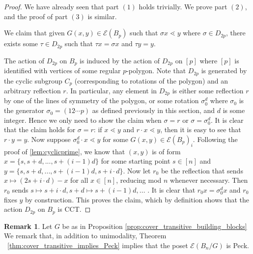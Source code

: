 \documentclass[10 pt]{amsart}
\theoremstyle{plain}
\theoremstyle{definition}
\newtheorem{rem}[thm]{Remark}
\theoremstyle{remark}
\numberwithin{equation}{section}
\begin{document}
\begin{proof}
We have already seen that part $(1)$ holds trivially. We prove part $(2)$, and the proof of part $(3)$ is similar. 

We claim that given $G(x, y) \in \mathcal E (B_p)$ such that $\sigma x \lessdot y$ where $\sigma \in D_{2p}$, there exists some $\tau \in D_{2p}$ such that $\tau x = \sigma x$ and $\tau y = y$. 

The action of $D_{2p}$ on $B_p$ is induced by the action of $D_{2p}$ on $[p]$ where $[p]$ is identified with vertices of some regular $p$-polygon. Note that $D_{2p}$ is generated by the cyclic subgroup $C_p$ (corresponding to rotations of the polygon) and an arbitrary reflection $r$. In particular, any element in $D_{2p}$ is either some reflection $r$ by one of the lines of symmetry of the polygon, or some rotation $\sigma_0^{d} $ where $\sigma_0$ is the generator $\sigma_0 = (12 \cdots p)$ as defined previously in this section, and $d$ is some integer. Hence we only need to show the claim when $\sigma = r$ or $\sigma = \sigma_0^d$. It is clear that the claim holds for $\sigma = r$: if $x \lessdot y$ and $r \cdot x \lessdot y$, then it is easy to see that $r \cdot y = y$. Now suppose $\sigma_0^d \cdot x \lessdot y$ for some $G(x,y) \in \mathcal E(B_p)_i$.  Following the proof of \ref{lem:cyclicprime}, we know that $(x, y)$ is of form $x = \{s, s+d, ..., s+(i-1)d\}$ for some starting point $s \in [n]$ and $y = \{s, s+d, ..., s+(i-1)d, s + i \cdot d\}$. Now let $r_0$ be the reflection that sends $x \mapsto (2s+ i \cdot d)-x$ for all $x \in [n]$, reducing mod $n$ whenever necessary. Then $r_0$ sends $s \mapsto s+i \cdot d, s+d \mapsto s+ (i-1)d, ...$ . It is clear that $r_0 x = \sigma_0^d x$ and $r_0$ fixes $y$ by construction. This proves the claim, which by definition shows that  the action $D_{2p}$ on $B_p$ is CCT. 
\end{proof}

\begin{rem}
Let $G$ be as in Proposition \ref{prop:cover_transitive_building_blocks} We remark that, in addition to unimodality, Theorem ~\ref{thm:cover_transitive_implies_Peck} implies that the poset $\mathcal E(B_n/G)$ is Peck.
\end{rem}
\end{document}

